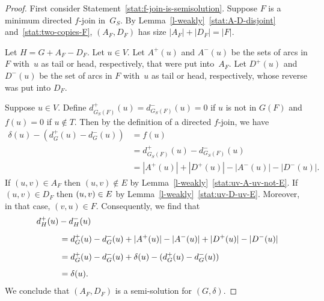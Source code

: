 \documentclass[11pt]{llncs}
\begin{document}
\begin{proof}
First consider Statement~\ref{stat:f-join-is-semisolution}.  Suppose $F$ is a minimum directed $f$-join
in~$G_S$.  By Lemma~\ref{l-weakly}~\ref{stat:A-D-disjoint} and~\ref{stat:two-copies-F}, $(A_F,D_F)$ has size
$|A_F|+|D_F|=|F|$.

Let $H=G+A_F-D_F$.  Let $u\in V$.  Let $A^+(u)$ and $A^-(u)$ be the sets of
arcs in $F$ with~$u$ as tail or head, respectively, that were put into~$A_F$.
Let $D^+(u)$ and $D^-(u)$ be the set of arcs in $F$ with~$u$ as tail or head,
respectively, whose reverse was put into $D_F$.

Suppose $u \in V$. Define $d^+_{G_S(F)}(u)=d^-_{G_S(F)}(u)=0$ if $u$ is not in $G(F)$ and $f(u)=0$ if $u\notin T$.
Then by the
definition of a directed $f$-join, we have
\begin{align*}
\delta(u)-(d^+_G(u)-d^-_G(u)) &= f(u)\\[5pt]
&= d^+_{G_S(F)}(u)-d^-_{G_S(F)}(u)\\[5pt]
&= |A^+(u)|+|D^+(u)|-|A^-(u)| - |D^-(u)|.
\end{align*}
If $(u,v)\in A_F$ then $(u,v)\notin E$ by Lemma~\ref{l-weakly}~\ref{stat:uv-A-uv-not-E}.  If
$(u,v)\in D_F$ then $(u,v)\in\nobreak E$ by Lemma~\ref{l-weakly}~\ref{stat:uv-D-uv-E}. Moreover, in
that case, $(v,u)\in F$.  Consequently, we find that
\begin{gather*}
d^+_H(u)-d^-_H(u)\hspace*{22em}\\[5pt]
\begin{align*}
\hspace*{3em}&= d^+_G(u)-d^-_G(u)+|A^+(u)| - |A^-(u)|+ |D^+(u)| - |D^-(u)|\\[5pt]
&= d^+_G(u)-d^-_G(u)+\delta(u)-(d^+_G(u)-d^-_G(u))\\[5pt]
&= \delta(u).
\end{align*}
\end{gather*}
We conclude that $(A_F,D_F)$ is
a semi-solution for $(G,\delta)$. 


\end{proof}
\end{document}
